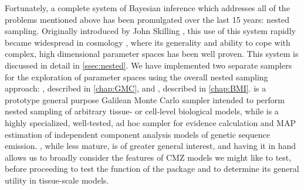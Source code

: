 Fortunately, a complete system of Bayesian inference which addresses all of the problems mentioned above has been promulgated over the last 15 years: nested sampling. Originally introduced by John Skilling \cite{Skilling2006}, this use of this system rapidly became widespread in cosmology \cite{Trotta2008,Feroz2009,Higson2019}, where its generality and ability to cope with complex, high dimensional parameter spaces has been well proven. This system is discussed in detail in \autoref{ssec:nested}. We have implemented two separate samplers for the exploration of parameter spaces using the overall nested sampling approach: , described in \autoref{chap:GMC}, and , described in \autoref{chap:BMI}.  is a prototype general purpose Galilean Monte Carlo sampler intended to perform nested sampling of arbitrary tissue- or cell-level biological models, while  is a highly specialized, well-tested, ad hoc sampler for evidence calculation and MAP estimation of independent component analysis models of genetic sequence emission. , while less mature, is of greater general interest, and having it in hand allows us to broadly consider the features of CMZ models we might like to test, before proceeding to test the function of the package and to determine its general utility in tissue-scale models.


